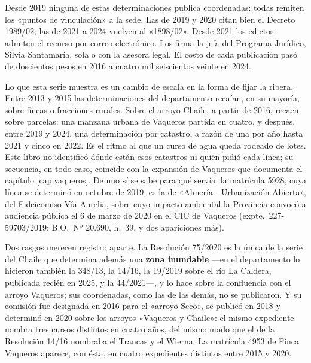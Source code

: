 Desde 2019 ninguna de estas determinaciones publica coordenadas: todas remiten los «puntos de vinculación» a la sede. Las de 2019 y 2020 citan bien el Decreto 1989/02; las de 2021 a 2024 vuelven al «1898/02». Desde 2021 los edictos admiten el recurso por correo electrónico. Los firma la jefa del Programa Jurídico, Silvia Santamaría, sola o con la asesora legal. El costo de cada publicación pasó de doscientos pesos en 2016 a cuatro mil seiscientos veinte en 2024.

\begin{cautela}
Lo que esta serie muestra es un cambio de escala en la forma de fijar la ribera. Entre 2013 y 2015 las determinaciones del departamento recaían, en su mayoría, sobre fincas o fracciones rurales. Sobre el arroyo Chaile, a partir de 2016, recaen sobre parcelas: una manzana urbana de Vaqueros partida en cuatro, y después, entre 2019 y 2024, una determinación por catastro, a razón de una por año hasta 2021 y cinco en 2022. Es el ritmo al que un curso de agua queda rodeado de lotes. Este libro no identificó dónde están esos catastros ni quién pidió cada línea; su secuencia, en todo caso, coincide con la expansión de Vaqueros que documenta el capítulo \ref{cap:vaqueros}. De uno sí se sabe para qué servía: la matrícula 5928, cuya línea se determinó en octubre de 2019, es la de «Almería - Urbanización Abierta», del Fideicomiso Vía Aurelia, sobre cuyo impacto ambiental la Provincia convocó a audiencia pública el 6 de marzo de 2020 en el CIC de Vaqueros (expte.\ 227-59703/2019; B.O.\ Nº 20.690, h.\ 39, y dos apariciones más).

Dos rasgos merecen registro aparte. La Resolución 75/2020 es la única de la serie del Chaile que determina además una \textbf{zona inundable} ---en el departamento lo hicieron también la 348/13, la 14/16, la 19/2019 sobre el río La Caldera, publicada recién en 2025, y la 44/2021---, y lo hace sobre la confluencia con el arroyo Vaqueros; sus coordenadas, como las de las demás, no se publicaron. Y su comisión fue designada en 2016 para el «arroyo Seco», se publicó en 2018 y determinó en 2020 sobre los arroyos «Vaqueros y Chaile»: el mismo expediente nombra tres cursos distintos en cuatro años, del mismo modo que el de la Resolución 14/16 nombraba el Trancas y el Wierna. La matrícula 4953 de Finca Vaqueros aparece, con ésta, en cuatro expedientes distintos entre 2015 y 2020. 
\end{cautela}

